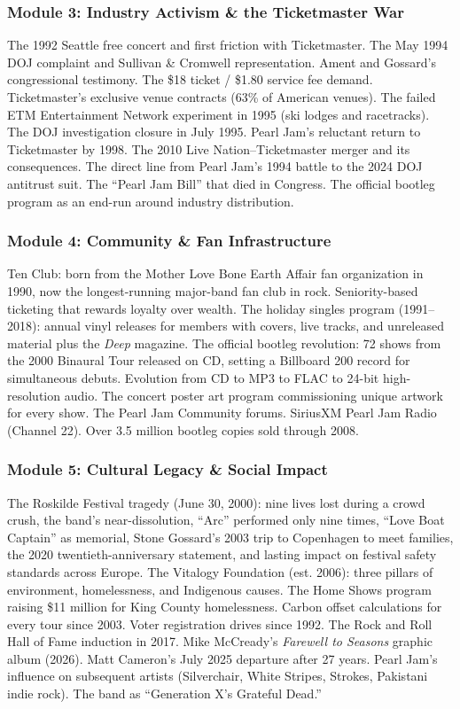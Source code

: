 \documentclass[11pt,letterpaper]{article}
\begin{document}
\subsubsection{Module 3: Industry Activism \& the Ticketmaster War}

The 1992 Seattle free concert and first friction with Ticketmaster. The May 1994 DOJ complaint and Sullivan \& Cromwell representation. Ament and Gossard's congressional testimony. The \$18 ticket / \$1.80 service fee demand. Ticketmaster's exclusive venue contracts (63\% of American venues). The failed ETM Entertainment Network experiment in 1995 (ski lodges and racetracks). The DOJ investigation closure in July 1995. Pearl Jam's reluctant return to Ticketmaster by 1998. The 2010 Live Nation--Ticketmaster merger and its consequences. The direct line from Pearl Jam's 1994 battle to the 2024 DOJ antitrust suit. The ``Pearl Jam Bill'' that died in Congress. The official bootleg program as an end-run around industry distribution.

\subsubsection{Module 4: Community \& Fan Infrastructure}

Ten Club: born from the Mother Love Bone Earth Affair fan organization in 1990, now the longest-running major-band fan club in rock. Seniority-based ticketing that rewards loyalty over wealth. The holiday singles program (1991--2018): annual vinyl releases for members with covers, live tracks, and unreleased material plus the \textit{Deep} magazine. The official bootleg revolution: 72 shows from the 2000 Binaural Tour released on CD, setting a Billboard 200 record for simultaneous debuts. Evolution from CD to MP3 to FLAC to 24-bit high-resolution audio. The concert poster art program commissioning unique artwork for every show. The Pearl Jam Community forums. SiriusXM Pearl Jam Radio (Channel 22). Over 3.5 million bootleg copies sold through 2008.

\subsubsection{Module 5: Cultural Legacy \& Social Impact}

The Roskilde Festival tragedy (June 30, 2000): nine lives lost during a crowd crush, the band's near-dissolution, ``Arc'' performed only nine times, ``Love Boat Captain'' as memorial, Stone Gossard's 2003 trip to Copenhagen to meet families, the 2020 twentieth-anniversary statement, and lasting impact on festival safety standards across Europe. The Vitalogy Foundation (est. 2006): three pillars of environment, homelessness, and Indigenous causes. The Home Shows program raising \$11 million for King County homelessness. Carbon offset calculations for every tour since 2003. Voter registration drives since 1992. The Rock and Roll Hall of Fame induction in 2017. Mike McCready's \textit{Farewell to Seasons} graphic album (2026). Matt Cameron's July 2025 departure after 27 years. Pearl Jam's influence on subsequent artists (Silverchair, White Stripes, Strokes, Pakistani indie rock). The band as ``Generation X's Grateful Dead.''
\end{document}
